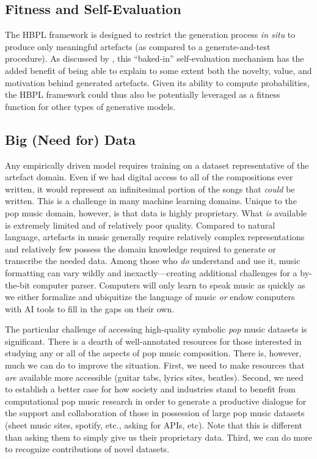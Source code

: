 \documentclass[phd,electronic,oneside,twosidetoc,letterpaper,chaptercenter,parttop,lof,lot]{byumsphd}
\begin{document}
\subsection{Fitness and Self-Evaluation}

The HBPL framework is designed to restrict the generation process \emph{in situ} to produce only meaningful artefacts (as compared to a generate-and-test procedure). As discussed by \citeauthor{Ventura2016} \cite{Ventura2016}, this ``baked-in'' self-evaluation mechanism has the added benefit of being able to explain to some extent both the novelty, value, and motivation behind generated artefacts. Given its ability to compute probabilities, the HBPL framework could thus also be potentially leveraged as a fitness function for other types of generative models.

\subsection{Big (Need for) Data}

Any empirically driven model requires training on a dataset representative of the artefact domain. Even if we had digital access to all of the compositions ever written, it would represent an infinitesimal portion of the songs that \emph{could} be written. This is a challenge in many machine learning domains. Unique to the pop music domain, however, is that data is highly proprietary. What \textit{is} available is extremely limited and of relatively poor quality. Compared to natural language, artefacts in music generally require relatively complex representations and relatively few possess the domain knowledge required to generate or transcribe the needed data. Among those who \textit{do} understand and use it, music formatting can vary wildly and inexactly---creating additional challenges for a by-the-bit computer parser. Computers will only learn to speak music as quickly as we either formalize and ubiquitize the language of music \textit{or} endow computers with AI tools to fill in the gaps on their own.

The particular challenge of accessing high-quality symbolic \emph{pop} music datasets is significant. There is a dearth of well-annotated resources for those interested in studying any or all of the aspects of pop music composition. There is, however, much we can do to improve the situation. First, we need to make resources that \textit{are} available more accessible (guitar tabs, lyrics sites, beatles). Second, we need to establish a better case for how society and industries stand to benefit from computational pop music research in order to generate a productive dialogue for the support and collaboration of those in possession of large pop music datasets (sheet music sites, spotify, etc., asking for APIs, etc). Note that this is different than asking them to simply give us their proprietary data. Third, we can do more to recognize contributions of novel datasets.
\end{document}
